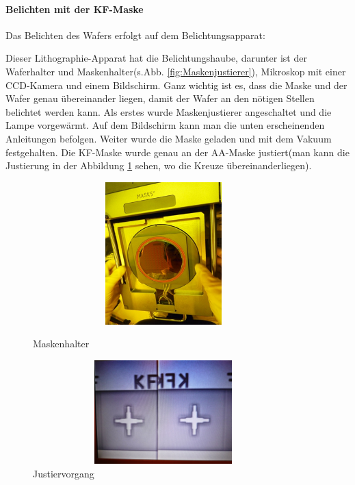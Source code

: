 \paragraph[Belichten mit der KF-Maske ]{Belichten mit der KF-Maske}

Das Belichten des Wafers erfolgt auf dem Belichtungsapparat:

Dieser Lithographie-Apparat hat die Belichtungshaube, darunter ist der Waferhalter und Maskenhalter(s.Abb. \ref{fig:Maskenjustierer}),  Mikroskop mit einer CCD-Kamera und einem Bildschirm.
Ganz wichtig ist es, dass die Maske und der Wafer genau übereinander liegen, damit der
Wafer an den nötigen Stellen belichtet werden kann.
 Als erstes wurde Maskenjustierer angeschaltet und die Lampe vorgewärmt. Auf dem Bildschirm kann man die unten erscheinenden Anleitungen befolgen. Weiter wurde die Maske geladen und mit dem Vakuum festgehalten. Die KF-Maske wurde genau an der AA-Maske justiert(man kann die Justierung in der Abbildung \ref{fig:Justiervorgang} sehen, wo die Kreuze übereinanderliegen).

\begin{figure}[H]
\centering
\begin{minipage}[hbt]{6cm}
    \centering
    \includegraphics[width=0.9\textwidth, height=5.5cm]{bilder/Maskenjustierer.png}
  \caption{Maskenhalter}
  \label{fig:Maskenjustierer}
\end{minipage}
\begin{minipage}[hbt]{6cm}
    \centering
    \includegraphics[width=0.9\textwidth,height=4cm]{bilder/Justiervorgang.png}
  \caption{Justiervorgang}
  \label{fig:Justiervorgang}
\end{minipage}

\end{figure}

